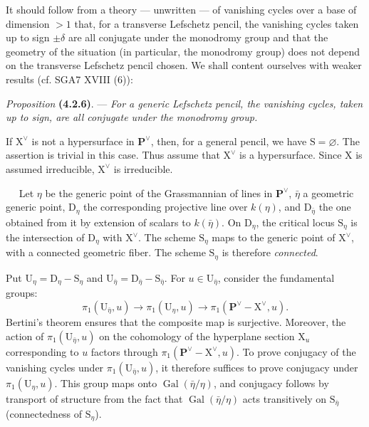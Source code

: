 \documentclass[11pt,leqno]{article}
\newcommand{\Page}[1]{\ifvmode\noindent\else\unskip\ \fi{\footnotesize\textcolor{gray}{[p.\,#1]}}\ \ignorespaces}
\begin{document}
It should follow from a theory — unwritten — of vanishing cycles over a base of dimension \(>1\) that, for a transverse Lefschetz pencil, the vanishing cycles taken up to sign \(\pm\delta\) are all conjugate under the monodromy group and that the geometry of the situation (in particular, the monodromy group) does not depend on the transverse Lefschetz pencil chosen. We shall content ourselves with weaker results (cf. SGA7 XVIII (6)):

\textit{Proposition} \textbf{(4.2.6)}. — \textit{For a generic Lefschetz pencil, the vanishing cycles, taken up to sign, are all conjugate under the monodromy group.}

If \(\mathrm{X}^{\vee}\) is not a hypersurface in \(\mathbf{P}^{\vee}\), then, for a general pencil, we have \(\mathrm{S}=\varnothing\). The assertion is trivial in this case. Thus assume that \(\mathrm{X}^{\vee}\) is a hypersurface. Since \(\mathrm{X}\) is assumed irreducible, \(\mathrm{X}^{\vee}\) is irreducible.

\Page{221}
Let \(\eta\) be the generic point of the Grassmannian of lines in \(\mathbf{P}^{\vee}\), \(\bar\eta\) a geometric generic point, \(\mathrm{D}_\eta\) the corresponding projective line over \(k(\eta)\), and \(\mathrm{D}_{\bar\eta}\) the one obtained from it by extension of scalars to \(k(\bar\eta)\). On \(\mathrm{D}_\eta\), the critical locus \(\mathrm{S}_\eta\) is the intersection of \(\mathrm{D}_\eta\) with \(\mathrm{X}^{\vee}\). The scheme \(\mathrm{S}_\eta\) maps to the generic point of \(\mathrm{X}^{\vee}\), with a connected geometric fiber. The scheme \(\mathrm{S}_\eta\) is therefore \textit{connected}.

Put \(\mathrm{U}_\eta=\mathrm{D}_\eta-\mathrm{S}_\eta\) and \(\mathrm{U}_{\bar\eta}=\mathrm{D}_{\bar\eta}-\mathrm{S}_{\bar\eta}\). For \(u\in\mathrm{U}_{\bar\eta}\), consider the fundamental groups:
\[
\pi_1(\mathrm{U}_{\bar\eta},u)
\to\pi_1(\mathrm{U}_\eta,u)
\to\pi_1(\mathbf{P}^{\vee}-\mathrm{X}^{\vee},u).
\]
Bertini’s theorem ensures that the composite map is surjective. Moreover, the action of \(\pi_1(\mathrm{U}_{\bar\eta},u)\) on the cohomology of the hyperplane section \(\mathrm{X}_u\) corresponding to \(u\) factors through \(\pi_1(\mathbf{P}^{\vee}-\mathrm{X}^{\vee},u)\). To prove conjugacy of the vanishing cycles under \(\pi_1(\mathrm{U}_{\bar\eta},u)\), it therefore suffices to prove conjugacy under \(\pi_1(\mathrm{U}_\eta,u)\). This group maps onto \(\operatorname{Gal}(\bar\eta/\eta)\), and conjugacy follows by transport of structure from the fact that \(\operatorname{Gal}(\bar\eta/\eta)\) acts transitively on \(\mathrm{S}_{\bar\eta}\) (connectedness of \(\mathrm{S}_\eta\)).
\end{document}
